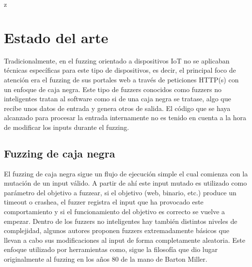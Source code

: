 z\chapter{Estado del arte}
\label{estado_del_arte}
Tradicionalmente, en el fuzzing orientado a dispositivos IoT no se aplicaban técnicas
específicas para este tipo de dispositivos, es decir, el principal foco de atención era el fuzzing de sus portales web a través 
de peticiones HTTP(s) con un enfoque de caja negra. Este tipo de fuzzers conocidos como fuzzers no inteligentes tratan al software como si de una caja negra se tratase, 
algo que recibe unos datos de entrada y genera otros de salida. El código que se haya alcanzado para procesar la entrada internamente no es tenido en
cuenta a la hora de modificar los inputs durante el fuzzing.

\section{Fuzzing de caja negra}
El fuzzing de caja negra sigue un flujo de ejecución simple el cual comienza con la mutación de un input válido.
A partir de ahí este input mutado es utilizado como parámetro del objetivo a fuzzear, si el 
objetivo (web, binario, etc.) produce un timeout o crashea, el fuzzer registra el input que 
ha provocado este comportamiento y si el funcionamiento del objetivo es correcto se vuelve a empezar. Dentro de los fuzzers no inteligentes hay también
distintos niveles de complejidad, algunos autores proponen fuzzers extremadamente básicos que 
llevan a cabo sus modificaciones al input de forma completamente aleatoria. Este enfoque utilizado por 
herramientas como\cite{zzuf}, sigue la filosofía que dio lugar originalmente al fuzzing en 
los años 80 de la mano de Barton Miller\cite{Miller1990}.

